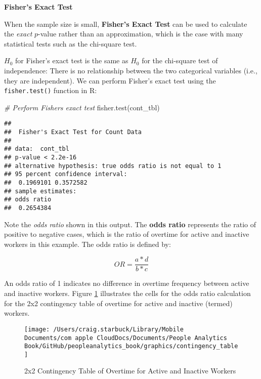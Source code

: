 \documentclass[
]{book}
\newenvironment{Shaded}{\begin{snugshade}}{\end{snugshade}}
\newcommand{\CommentTok}[1]{\textcolor[rgb]{0.56,0.35,0.01}{\textit{#1}}}
\newcommand{\FunctionTok}[1]{\textcolor[rgb]{0.00,0.00,0.00}{#1}}
\newcommand{\NormalTok}[1]{#1}
\begin{document}
\textbf{Fisher's Exact Test}

When the sample size is small, \textbf{Fisher's Exact Test} can be used to calculate the \emph{exact} \(p\)-value rather than an approximation, which is the case with many statistical tests such as the chi-square test.

\(H_0\) for Fisher's exact test is the same as \(H_0\) for the chi-square test of independence: There is no relationship between the two categorical variables (i.e., they are independent). We can perform Fisher's exact test using the \texttt{fisher.test()} function in R:

\begin{Shaded}
\begin{Highlighting}[]
\CommentTok{\# Perform Fisher\textquotesingle{}s exact test}
\FunctionTok{fisher.test}\NormalTok{(cont\_tbl)}
\end{Highlighting}
\end{Shaded}

\begin{verbatim}
## 
##  Fisher's Exact Test for Count Data
## 
## data:  cont_tbl
## p-value < 2.2e-16
## alternative hypothesis: true odds ratio is not equal to 1
## 95 percent confidence interval:
##  0.1969101 0.3572582
## sample estimates:
## odds ratio 
##  0.2654384
\end{verbatim}

Note the \emph{odds ratio} shown in this output. The \textbf{odds ratio} represents the ratio of positive to negative cases, which is the ratio of overtime for active and inactive workers in this example. The odds ratio is defined by:

\[OR = \frac{a*d}{b*c}\]

An odds ratio of 1 indicates no difference in overtime frequency between active and inactive workers. Figure \ref{fig:contingency-tbl} illustrates the cells for the odds ratio calculation for the 2x2 contingency table of overtime for active and inactive (termed) workers.

\begin{figure}

{\centering \texttt{[image: /Users/craig.starbuck/Library/Mobile Documents/com~apple~CloudDocs/Documents/People Analytics Book/GitHub/peopleanalytics\_book/graphics/contingency\_table]} 

}

\caption{2x2 Contingency Table of Overtime for Active and Inactive Workers}\label{fig:contingency-tbl}
\end{figure}
\end{document}
